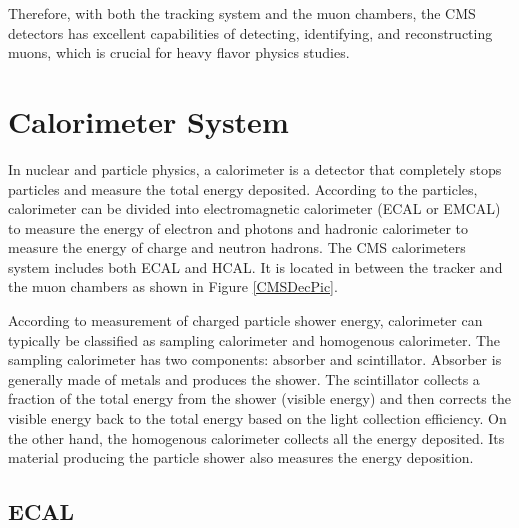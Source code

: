 
Therefore, with both the tracking system and the muon chambers, the CMS detectors has excellent capabilities of detecting, identifying, and reconstructing muons, which is crucial for heavy flavor physics studies.

\section{Calorimeter System}

In nuclear and particle physics, a calorimeter is a detector that completely stops particles and measure the total energy deposited. According to the particles, calorimeter can be divided into electromagnetic calorimeter (ECAL or EMCAL) to measure the energy of electron and photons and hadronic calorimeter to measure the energy of charge and neutron hadrons. The CMS calorimeters system includes both ECAL and HCAL. It is located in between the tracker and the muon chambers as shown in Figure \ref{CMSDecPic}. 

According to measurement of charged particle shower energy, calorimeter can typically be classified as sampling calorimeter and homogenous calorimeter. The sampling calorimeter has two components: absorber and scintillator. Absorber is generally made of metals and produces the shower. The scintillator collects a fraction of the total energy from the shower (visible energy) and then corrects the visible energy back to the total energy based on the light collection efficiency. On the other hand, the homogenous calorimeter collects all the energy deposited. Its material producing the particle shower also measures the energy deposition. 

\subsection{ECAL}

